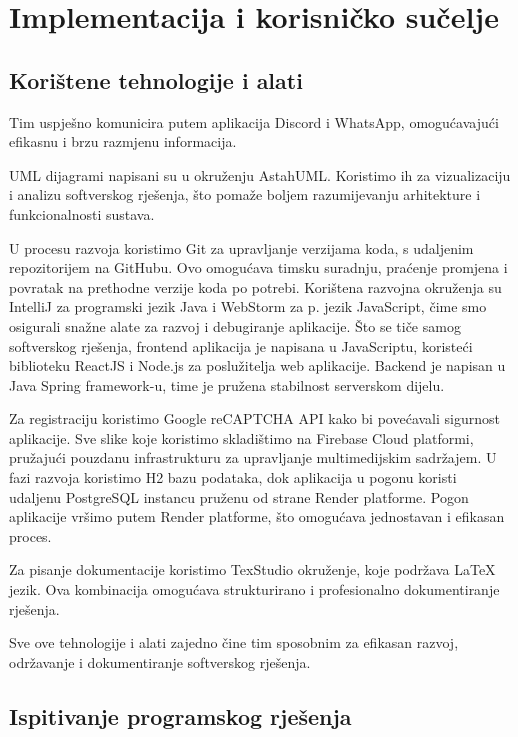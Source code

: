 \chapter{Implementacija i korisničko sučelje}
		
		
		\section{Korištene tehnologije i alati}
			
			Tim uspješno komunicira putem aplikacija Discord i WhatsApp, omogućavajući efikasnu i brzu razmjenu informacija. 
			
			UML dijagrami napisani su u okruženju AstahUML. Koristimo ih za vizualizaciju i analizu softverskog rješenja, što pomaže boljem razumijevanju arhitekture i funkcionalnosti sustava.
			
			U procesu razvoja koristimo Git za upravljanje verzijama koda, s udaljenim repozitorijem na GitHubu. Ovo omogućava timsku suradnju, praćenje promjena i povratak na prethodne verzije koda po potrebi. Korištena razvojna okruženja su IntelliJ za programski jezik Java i WebStorm za p. jezik JavaScript, čime smo osigurali snažne alate za razvoj i debugiranje aplikacije. Što se tiče samog softverskog rješenja, frontend aplikacija je napisana u JavaScriptu, koristeći biblioteku ReactJS i Node.js za poslužitelja web aplikacije. Backend je napisan u Java Spring framework-u, time je pružena stabilnost serverskom dijelu.
			
			Za registraciju koristimo Google reCAPTCHA API kako bi povećavali sigurnost aplikacije. Sve slike koje koristimo skladištimo na Firebase Cloud platformi, pružajući pouzdanu infrastrukturu za upravljanje multimedijskim sadržajem. 
			U fazi razvoja koristimo H2 bazu podataka, dok aplikacija u pogonu koristi udaljenu PostgreSQL instancu pruženu od strane Render platforme. Pogon aplikacije vršimo putem Render platforme, što omogućava jednostavan i efikasan proces.
			
			Za pisanje dokumentacije koristimo TexStudio okruženje, koje podržava LaTeX jezik. Ova kombinacija omogućava strukturirano i profesionalno dokumentiranje rješenja. 
			
			Sve ove tehnologije i alati zajedno čine tim sposobnim za efikasan razvoj, održavanje i dokumentiranje softverskog rješenja.
			
			\eject 
		
	
		\section{Ispitivanje programskog rješenja}
			
